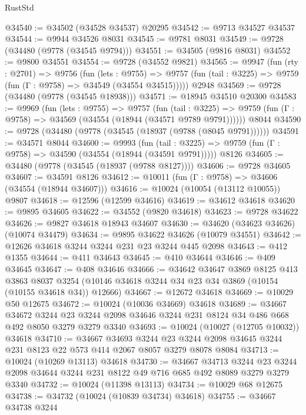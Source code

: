 \begin{lexlean}{RustStd}
\begin{coremodule}
{\begin{coremodule}
{{{{{{{{{{{{{{{{{{{{{{{{{{@34540 := @34502 (@34528 @34537) @20295
@34542 := @9713 @34527 @34537
@34544 := @9944 @34526 @8031
@34545 := @9781 @8031
@34549 := @9728 (@34480 (@9778 (@34545 @9794)))
@34551 := @34505 (@9816 @8031)
@34552 := @9800 @34551
@34554 := @9728 (@34552 @9821)
@34565 := @9947
    (fun (rty : @2701) =>
    @9756
      (fun (lets : @9755) =>
      @9757 (fun (tail : @3225) => @9759 (fun (Γ : @9758) => @34549 (@34554 @34515)))))
    @2948
@34569 := @9728 (@34480 (@9778 (@34545 @18938)))
@34571 := @18945 @34510 @20300
@34583 := @9969
    (fun (lets : @9755) =>
    @9757
      (fun (tail : @3225) =>
      @9759 (fun (Γ : @9758) => @34569 (@34554 (@18944 (@34571 @9789 @9791))))))
    @8044
@34590 := @9728 (@34480 (@9778 (@34545 (@18937 (@9788 (@8045 @9791))))))
@34591 := @34571 @8044
@34600 := @9993
    (fun (tail : @3225) => @9759 (fun (Γ : @9758) => @34590 (@34554 (@18944 (@34591 @9791)))))
    @8126
@34605 := @34480 (@9778 (@34545 (@18937 (@9788 @8127))))
@34606 := @9728 @34605
@34607 := @34591 @8126
@34612 := @10011 (fun (Γ : @9758) => @34606 (@34554 (@18944 @34607)))
@34616 := @10024 (@10054 (@13112 @10055)) @9807
@34618 := @12596 (@12599 @34616)
@34619 := @34612 @34618
@34620 := @9895 @34605
@34622 := @34552 (@9820 @34618)
@34623 := @9728 @34622
@34626 := @9827 @34618 @18943 @34607
@34630 := @34620 (@34623 @34626) (@10074 @34479)
@34634 := @9895 @34622 @34626 (@10079 @34551)
@34642 := @12626 @34618 @3244 @3244 @231 @23 @3244 @445 @2098
@34643 := @412 @1355
@34644 := @411 @34643
@34645 := @410 @34644
@34646 := @409 @34645
@34647 := @408 @34646
@34666 := @34642
    @34647
    @3869
    @8125
    @413
    @3863
    @8037
    @3254
    (@10146 @34618 @3244 @34 @23 @34 @3869 (@10154 (@10155 @34618 @34)) @12666)
@34667 := @12672 @34618
@34669 := @10029 @50 @12675
@34672 := @10024 (@10036 @34669) @34618
@34689 := @34667
    @34672
    @3244
    @23
    @3244
    @2098
    @34646
    @3244
    @231
    @8124
    @34
    @486
    @668
    @492
    @8050
    @3279
    @3279
    @3340
@34693 := @10024 (@10027 (@12705 @10032)) @34618
@34710 := @34667
    @34693
    @3244
    @23
    @3244
    @2098
    @34645
    @3244
    @231
    @8123
    @22
    @573
    @414
    @2067
    @8057
    @3279
    @8078
    @8084
@34713 := @10024 (@10269 @13113) @34618
@34730 := @34667
    @34713
    @3244
    @23
    @3244
    @2098
    @34644
    @3244
    @231
    @8122
    @49
    @716
    @685
    @492
    @8089
    @3279
    @3279
    @3340
@34732 := @10024 (@11398 @13113)
@34734 := @10029 @68 @12675
@34738 := @34732 (@10024 (@10839 @34734) @34618)
@34755 := @34667
    @34738
    @3244
}}}}}}}}}}}}}}}}}}}}}}}}}}
\end{coremodule}}
\end{coremodule}
\end{lexlean}

